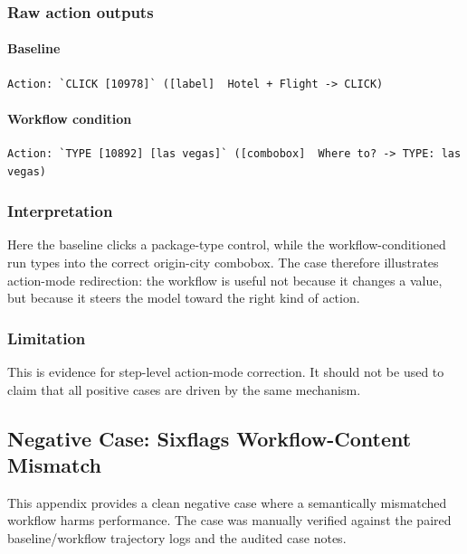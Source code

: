 \subsubsection{Raw action outputs}

\paragraph{Baseline}

\begin{verbatim}
Action: `CLICK [10978]` ([label]  Hotel + Flight -> CLICK)
\end{verbatim}

\paragraph{Workflow condition}

\begin{verbatim}
Action: `TYPE [10892] [las vegas]` ([combobox]  Where to? -> TYPE: las vegas)
\end{verbatim}

\subsubsection{Interpretation}

Here the baseline clicks a package-type control, while the
workflow-conditioned run types into the correct origin-city combobox.
The case therefore illustrates action-mode redirection: the workflow is
useful not because it changes a value, but because it steers the model
toward the right kind of action.

\subsubsection{Limitation}

This is evidence for step-level action-mode correction. It should not be
used to claim that all positive cases are driven by the same mechanism.


\clearpage
\subsection{Negative Case: Sixflags Workflow-Content Mismatch}\label{app:B4}

This appendix provides a clean negative case where a semantically
mismatched workflow harms performance. The case was manually verified
against the paired baseline/workflow trajectory logs and the audited
case notes.


